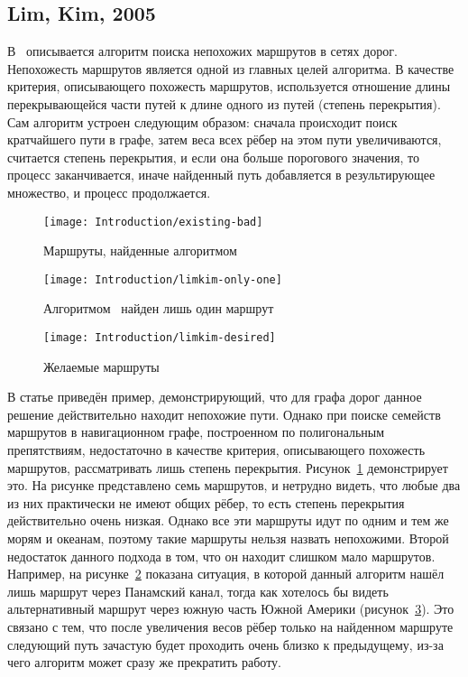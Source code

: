 \FloatBarrier

\subsection{Lim, Kim, 2005}

\label{subsec:lim-kim}

В~\cite{lim2005shortest} описывается алгоритм поиска непохожих
маршрутов в сетях дорог. Непохожесть маршрутов является одной из
главных целей алгоритма. В качестве критерия, описывающего похожесть
маршрутов, используется отношение длины перекрывающейся части путей к
длине одного из путей (степень перекрытия). Сам алгоритм устроен
следующим образом: сначала происходит поиск кратчайшего пути в графе,
затем веса всех рёбер на этом пути увеличиваются, считается степень
перекрытия, и если она больше порогового значения, то процесс
заканчивается, иначе найденный путь добавляется в результирующее
множество, и процесс продолжается.

\begin{figure}
    \texttt{[image: Introduction/existing-bad]}
    \caption{Маршруты, найденные алгоритмом~\cite{lim2005shortest}}
    \label{fig:limkim1}
\end{figure}

\begin{figure}
    \texttt{[image: Introduction/limkim-only-one]}
    \caption{Алгоритмом~\cite{lim2005shortest} найден лишь один маршрут}
    \label{fig:limkim2}
\end{figure}

\begin{figure}
    \texttt{[image: Introduction/limkim-desired]}
    \caption{Желаемые маршруты}
    \label{fig:limkim3}
\end{figure}

В статье приведён пример, демонстрирующий, что для графа дорог данное
решение действительно находит непохожие пути. Однако при поиске
семейств маршрутов в навигационном графе, построенном по полигональным
препятствиям, недостаточно в качестве критерия, описывающего похожесть
маршрутов, рассматривать лишь степень перекрытия.
Рисунок~\ref{fig:limkim1} демонстрирует это. На рисунке представлено
семь маршрутов, и нетрудно видеть, что любые два из них практически не
имеют общих рёбер, то есть степень перекрытия действительно очень
низкая. Однако все эти маршруты идут по одним и тем же морям и
океанам, поэтому такие маршруты нельзя назвать непохожими. Второй
недостаток данного подхода в том, что он находит слишком мало
маршрутов. Например, на рисунке~\ref{fig:limkim2} показана ситуация, в
которой данный алгоритм нашёл лишь маршрут через Панамский канал,
тогда как хотелось бы видеть альтернативный маршрут через южную часть
Южной Америки (рисунок~\ref{fig:limkim3}). Это связано с тем, что
после увеличения весов рёбер только на найденном маршруте следующий
путь зачастую будет проходить очень близко к предыдущему, из-за чего
алгоритм может сразу же прекратить работу.

